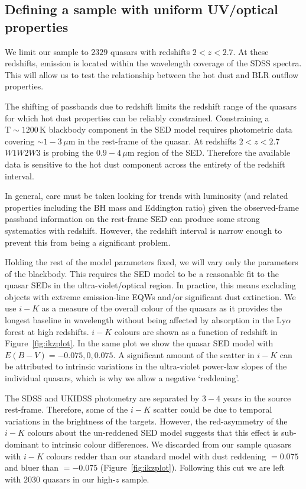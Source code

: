 \subsection{Defining a sample with uniform UV/optical properties}

We limit our sample to $2329$ quasars with redshifts $2 < z < 2.7$. 
At these redshifts,  emission is located within the wavelength coverage of the SDSS spectra.
This will allow us to test the relationship between the hot dust and BLR outflow properties. 

The shifting of passbands due to redshift limits the redshift range of the quasars for which hot dust properties can be reliably constrained.
Constraining a ${\mathrm T}\sim1200$\,K blackbody component in the SED model requires photometric data covering $\sim1-3$\,$\mu$m in the rest-frame of the quasar. 
At redshifts $2 < z < 2.7$ $W1W2W3$ is probing the $0.9-4$\,$\mu$m region of the SED. 
Therefore the available data is sensitive to the hot dust component across the entirety of the redshift interval. 

In general, care must be taken looking for trends with luminosity (and related properties including the BH mass and Eddington ratio) given the observed-frame passband information on the rest-frame SED can produce some strong systematics with redshift.
However, the redshift interval is narrow enough to prevent this from being a significant problem. 

Holding the rest of the model parameters fixed, we will vary only the parameters of the blackbody. 
This requires the SED model to be a reasonable fit to the quasar SEDs in the ultra-violet/optical region. 
In practice, this means excluding objects with extreme emission-line EQWs and/or significant dust extinction.
We use $i-K$ as a measure of the overall colour of the quasars as it provides the longest baseline in wavelength without being affected by absorption in the Ly$\alpha$ forest at high redshifts. 
$i-K$ colours are shown as a function of redshift in Figure~\ref{fig:ikzplot}.
In the same plot we show the quasar SED model with $E(B-V)=-0.075,0,0.075$. 
A significant amount of the scatter in $i-K$ can be attributed to intrinsic variations in the ultra-violet power-law slopes of the individual quasars, which is why we allow a negative `reddening'. 

The SDSS and UKIDSS photometry are separated by $3-4$ years in the source rest-frame. 
Therefore, some of the $i-K$ scatter could be due to temporal variations in the brightness of the targets. 
However, the red-asymmetry of the $i-K$ colours about the un-reddened SED model suggests that this effect is sub-dominant to intrinsic colour differences. 
We discarded from our sample quasars with $i - K$ colours redder than our standard model with dust reddening \ebv $= 0.075$ and bluer than \ebv $=-0.075$ (Figure~\ref{fig:ikzplot}). 
Following this cut we are left with $2030$ quasars in our high-$z$ sample. 

